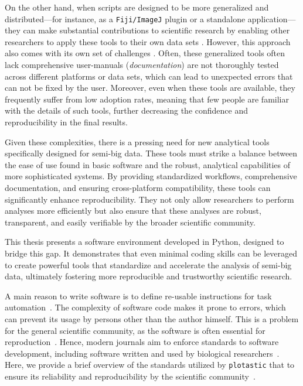 On the other hand, when scripts are designed to be more generalized and
distributed—for instance, as a \texttt{Fiji/ImageJ} plugin or a standalone
application—they can make substantial contributions to scientific research by
enabling other researchers to apply these tools to their own data sets
\cite{narztReusabilityConceptProcess1998,smithJournalOpenSource2018}. However, this approach also comes
with its own set of challenges \cite{sandveTenSimpleRules2013}. Often, these
generalized tools often lack comprehensive user-manuals (\emph{documentation})
are not thoroughly tested across different platforms or data sets, which can
lead to unexpected errors that can not be fixed by the user. Moreover, even when
these tools are available, they frequently suffer from low adoption rates,
meaning that few people are familiar with the details of such tools, further
decreasing the confidence and reproducibility in the final results.

Given these complexities, there is a pressing need for new analytical tools
specifically designed for semi-big data. These tools must strike a balance
between the ease of use found in basic software and the robust, analytical
capabilities of more sophisticated systems. By providing standardized workflows,
comprehensive documentation, and ensuring cross-platform compatibility, these
tools can significantly enhance reproducibility. They not only allow researchers
to perform analyses more efficiently but also ensure that these analyses are
robust, transparent, and easily verifiable by the broader scientific community.

This thesis presents a software environment developed in Python, designed to
bridge this gap. It demonstrates that even minimal coding skills can be
leveraged to create powerful tools that standardize and accelerate the analysis
of semi-big data, ultimately fostering more reproducible and trustworthy
scientific research.







\label{sec:code_quality}
A main reason to write software is to define re-usable instructions for task
automation~\cite{narztReusabilityConceptProcess1998}.
The complexity of software code makes it prone to errors, which can prevent
its usage by persons other than the author himself. This is a problem for the
general scientific community, as the software is often essential for
reproduction~\cite{sandveTenSimpleRules2013}. Hence, modern journals aim to
enforce standards to software development, including software written and used
by biological researchers~\cite{smithJournalOpenSource2018}. Here, we provide a
brief overview of the standards utilized by \texttt{plotastic} that to ensure
its reliability and reproducibility by the scientific
community~\cite{pengReproducibleResearchComputational2011}.


